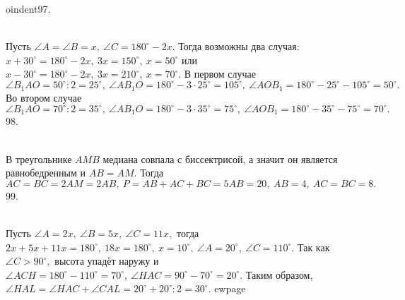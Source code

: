 oindent97. \begin{figure}[ht!]
\end{figure}\\
Пусть $\angle A=\angle B=x,\ \angle C=180^\circ-2x.$ Тогда возможны два случая: $x+30^\circ=180^\circ-2x,\ 3x=150^\circ,\ x=50^\circ$ или $x-30^\circ=180^\circ-2x,\
3x=210^\circ,\ x=70^\circ.$ В первом случае  $\angle B_1AO=50^\circ:2=25^\circ,\ \angle AB_1O=180^\circ-3\cdot25^\circ=105^\circ,\ \angle AOB_1=180^\circ-25^\circ-105^\circ=50^\circ.$ Во втором случае  $\angle B_1AO=70^\circ:2=35^\circ,\ \angle AB_1O=180^\circ-3\cdot35^\circ=75^\circ,\ \angle AOB_1=180^\circ-35^\circ-75^\circ=70^\circ.$\\
98. \begin{figure}[ht!]
\end{figure}\\
В треугольнике $AMB$ медиана совпала с биссектрисой, а значит он является равнобедренным и $AB=AM.$ Тогда $AC=BC=2AM=2AB,\ P=AB+AC+BC=5AB=20,\ AB=4,\ AC=BC=8.$\\
99.\begin{figure}[ht!]
\end{figure}\\
Пусть $\angle A=2x,\ \angle B=5x,\ \angle C=11x,$ тогда $2x+5x+11x=180^\circ,\ 18x=180^\circ,\ x=10^\circ,\ \angle A=20^\circ,\ \angle C=110^\circ.$ Так как $\angle C>90^\circ,$ высота упадёт наружу и  $\angle ACH=180^\circ-110^\circ=70^\circ,\ \angle HAC=90^\circ-70^\circ=20^\circ.$ Таким образом, $\angle HAL=\angle HAC+\angle CAL=20^\circ+20^\circ:2=30^\circ.$
ewpage

